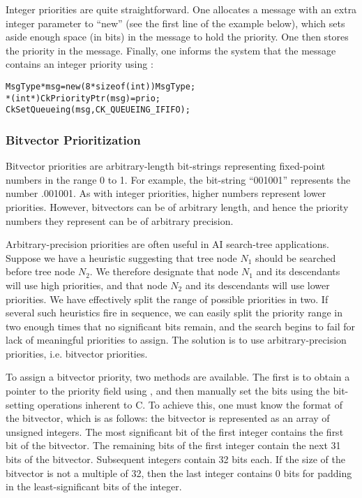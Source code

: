 
Integer priorities are quite straightforward.  One allocates a message
with an extra integer parameter to ``new'' (see the first line of the
example below), which sets aside enough space (in bits) in the message
to hold the priority.  One then stores the priority in the message.
Finally, one informs the system that the message contains an integer
priority using :

\begin{alltt}
  MsgType *msg = new (8*sizeof(int)) MsgType;
  *(int*)CkPriorityPtr(msg) = prio;
  CkSetQueueing(msg, CK_QUEUEING_IFIFO);
\end{alltt}

\subsubsection{Bitvector Prioritization}

Bitvector priorities are arbitrary-length bit-strings representing fixed-point
numbers in the range 0 to 1.  For example, the bit-string ``001001'' represents
the number .001001\raisebox{-.5ex}{\scriptsize binary}.  As with integer
priorities, higher numbers represent lower priorities.  However, bitvectors can
be of arbitrary length, and hence the priority numbers they represent can be
of arbitrary precision.

Arbitrary-precision priorities are often
useful in AI search-tree applications.  Suppose we have a heuristic suggesting
that tree node $N_1$ should be searched before tree node $N_2$.  We therefore
designate that node $N_1$ and its descendants will use high priorities, and
that node $N_2$ and its descendants will use lower priorities.  We have
effectively split the range of possible priorities in two.  If several such
heuristics fire in sequence, we can easily split the priority range
 in two enough times that no significant bits
remain, and the search begins to fail for lack of meaningful priorities to
assign.  The solution is to use arbitrary-precision priorities, i.e. bitvector
priorities.

To assign a bitvector priority, two methods are available.  The first is to
obtain a pointer to the priority field using , and then
manually set the bits using the bit-setting operations inherent to C.  To
achieve this, one must know the format  of the
bitvector, which is as follows: the bitvector is represented as an array of
unsigned integers.  The most significant bit of the first integer contains the
first bit of the bitvector.  The remaining bits of the first integer contain
the next 31 bits of the bitvector.  Subsequent integers contain 32 bits each.
If the size of the bitvector is not a multiple of 32, then the last integer
contains 0 bits for padding in the least-significant bits of the integer.

